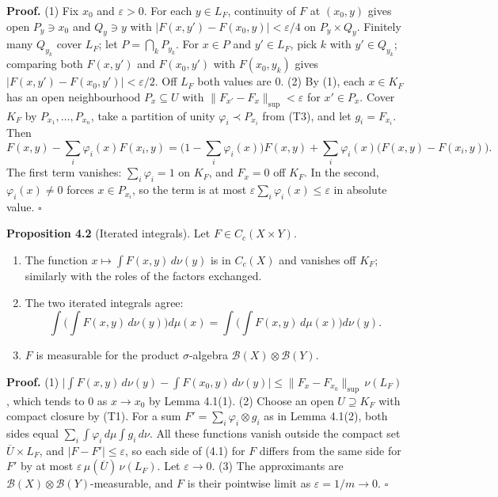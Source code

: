 \documentclass[
  english,
  11pt,
  a4paper,
]{article}
\providecommand{\tightlist}{%
  \setlength{\itemsep}{0pt}\setlength{\parskip}{0pt}}
\begin{document}
\textbf{Proof.} (1) Fix \(x_0\) and \(\varepsilon>0\). For each
\(y\in L_F\), continuity of \(F\) at \((x_0,y)\) gives open
\(P_y\ni x_0\) and \(Q_y\ni y\) with
\(|F(x,y')-F(x_0,y)|<\varepsilon/4\) on \(P_y\times Q_y\). Finitely many
\(Q_{y_k}\) cover \(L_F\); let \(P=\bigcap_kP_{y_k}\). For \(x\in P\)
and \(y'\in L_F\), pick \(k\) with \(y'\in Q_{y_k}\); comparing both
\(F(x,y')\) and \(F(x_0,y')\) with \(F(x_0,y_k)\) gives
\(|F(x,y')-F(x_0,y')|<\varepsilon/2\). Off \(L_F\) both values are
\(0\). (2) By (1), each \(x\in K_F\) has an open neighbourhood
\(P_x\subseteq U\) with \(\|F_{x'}-F_x\|_{\sup}<\varepsilon\) for
\(x'\in P_x\). Cover \(K_F\) by \(P_{x_1},\dots,P_{x_n}\), take a
partition of unity \(\varphi_i\prec P_{x_i}\) from (T3), and let
\(g_i=F_{x_i}\). Then
\[F(x,y)-\sum_i\varphi_i(x)F(x_i,y)=\Big(1-\sum_i\varphi_i(x)\Big)F(x,y)+\sum_i\varphi_i(x)\big(F(x,y)-F(x_i,y)\big).\]
The first term vanishes: \(\sum_i\varphi_i=1\) on \(K_F\), and \(F_x=0\)
off \(K_F\). In the second, \(\varphi_i(x)\neq0\) forces
\(x\in P_{x_i}\), so the term is at most
\(\varepsilon\sum_i\varphi_i(x)\leq\varepsilon\) in absolute value.
\(\square\)

\textbf{Proposition 4.2} (Iterated integrals). Let
\(F\in C_c(X\times Y)\).

\begin{enumerate}
\tightlist
\item
  The function \(x\mapsto\int F(x,y)\,d\nu(y)\) is in \(C_c(X)\) and
  vanishes off \(K_F\); similarly with the roles of the factors
  exchanged.
\item
  The two iterated integrals agree:
  \[\int\Big(\int F(x,y)\,d\nu(y)\Big)d\mu(x)=\int\Big(\int F(x,y)\,d\mu(x)\Big)d\nu(y).
  \tag{4.1}\]
\item
  \(F\) is measurable for the product \(\sigma\)-algebra
  \(\mathcal B(X)\otimes\mathcal B(Y)\).
\end{enumerate}

\textbf{Proof.} (1)
\(\big|\int F(x,y)\,d\nu(y)-\int F(x_0,y)\,d\nu(y)\big|\leq\|F_x-F_{x_0}\|_{\sup}\,\nu(L_F)\),
which tends to \(0\) as \(x\to x_0\) by Lemma 4.1(1). (2) Choose an open
\(U\supseteq K_F\) with compact closure by (T1). For a sum
\(F'=\sum_i\varphi_i\otimes g_i\) as in Lemma 4.1(2), both sides equal
\(\sum_i\int\varphi_i\,d\mu\int g_i\,d\nu\). All these functions vanish
outside the compact set \(\overline U\times L_F\), and
\(|F-F'|\leq\varepsilon\), so each side of (4.1) for \(F\) differs from
the same side for \(F'\) by at most
\(\varepsilon\,\mu(\overline U)\,\nu(L_F)\). Let \(\varepsilon\to0\).
(3) The approximants are
\(\mathcal B(X)\otimes\mathcal B(Y)\)-measurable, and \(F\) is their
pointwise limit as \(\varepsilon=1/m\to0\). \(\square\)
\end{document}
